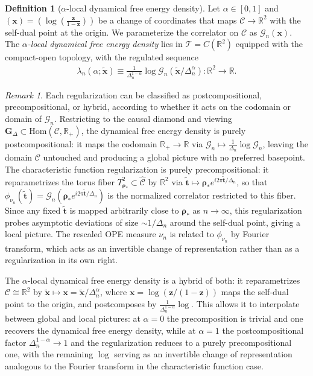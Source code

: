 \documentclass[a4paper,11pt]{article}
\theoremstyle{plain}
\theoremstyle{definition}
\newtheorem{defn}{Definition}[section]
\theoremstyle{remark}
\newtheorem*{rem}{Remark}
\newcommand{\bs}[1]{\boldsymbol{#1}}
\newcommand{\ba}{\begin{equation} \begin{aligned}}
\newcommand{\ea}{\end{aligned} \end{equation}}
\newcommand{\De}{\Delta}
\begin{document}
\begin{defn}[$\alpha$-local dynamical free energy density]
\label{def:alphalocal}
Let $\alpha \in [0,1]$ and $(\bs{x}) = (\log(\frac{\bs{z}}{1-\bs{z}}))$ be a change of coordinates that maps $\mathscr{C} \to \mathbb{R}^2$ with the self-dual point at the origin. We parameterize the correlator on $\mathscr{C}$ as $\mathcal{G}_n(\bs{x})$. The \textit{$\alpha$-local dynamical free energy density} lies in $\mathcal{T} = C(\mathbb{R}^2)$ equipped with the compact-open topology, with the regulated sequence
\ba
\lambda_n(\alpha; \tilde{\bs{x}}) \equiv \frac{1}{\De_n^{1-\alpha}} \log \mathcal{G}_n(\tilde{\bs{x}}/\De_n^{\alpha}): \mathbb{R}^2 \to \mathbb{R}.
\ea
\end{defn}
 
\begin{rem}
    Each regularization can be classified as postcompositional, precompositional, or hybrid, according to whether it acts on the codomain or domain of $\mathcal{G}_n$. Restricting to the causal diamond and viewing $\mathbf{G}_{\De} \subset \mathrm{Hom}(\mathscr{C}, \mathbb{R}_+)$, the dynamical free energy density is purely postcompositional: it maps the codomain $\mathbb{R}_+ \to \mathbb{R}$ via $\mathcal{G}_n \mapsto \frac{1}{\De_n}\log \mathcal{G}_n$, leaving the domain $\mathscr{C}$ untouched and producing a global picture with no preferred basepoint. The characteristic function regularization is purely precompositional: it reparametrizes the torus fiber $T^2_{\bs{\rho}_*} \subset \widehat{\mathscr{C}}$ by $\mathbb{R}^2$ via $\tilde{\bs{t}} \mapsto \bs{\rho}_* e^{i2\pi\tilde{\bs{t}}/\De_n}$, so that $\phi_{\nu_n}(\tilde{\bs{t}}) = \mathcal{G}_n(\bs{\rho}_* e^{i2\pi\tilde{\bs{t}}/\De_n})$ is the normalized correlator restricted to this fiber. Since any fixed $\tilde{\bs{t}}$ is mapped arbitrarily close to $\bs{\rho}_*$ as $n \to \infty$, this regularization probes asymptotic deviations of size $\sim 1/\De_n$ around the self-dual point, giving a local picture. The rescaled OPE measure $\nu_n$ is related to $\phi_{\nu_n}$ by Fourier transform, which acts as an invertible change of representation rather than as a regularization in its own right.
 
The $\alpha$-local dynamical free energy density is a hybrid of both: it reparametrizes $\mathscr{C} \cong \mathbb{R}^2$ by $\tilde{\bs{x}} \mapsto \bs{x} = \tilde{\bs{x}}/ \De_n^\alpha$, where $\bs{x} = \log(\bs{z}/(1-\bs{z}))$ maps the self-dual point to the origin, and postcomposes by $\frac{1}{\De_n^{1-\alpha}}\log$. This allows it to interpolate between global and local pictures: at $\alpha = 0$ the precomposition is trivial and one recovers the dynamical free energy density, while at $\alpha = 1$ the postcompositional factor $\De_n^{1-\alpha} \to 1$ and the regularization reduces to a purely precompositional one, with the remaining $\log$ serving as an invertible change of representation analogous to the Fourier transform in the characteristic function case.
\end{rem}
 
\end{document}
